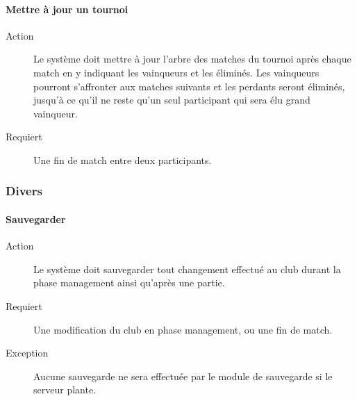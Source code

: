 \documentclass[a4paper]{article}
\begin{document}
\paragraph{Mettre à jour un tournoi}
\begin{description}
\item[Action] Le système doit mettre à jour l'arbre des matches du tournoi après chaque match en y indiquant les vainqueurs et les éliminés. Les vainqueurs pourront s'affronter aux matches suivants et les perdants seront éliminés, jusqu'à ce qu'il ne reste qu'un seul participant qui sera élu grand vainqueur.
\item[Requiert] Une fin de match entre deux participants.
\end{description}

\subsubsection{Divers}
\paragraph{Sauvegarder}
\begin{description}
\item[Action] Le système doit sauvegarder tout changement effectué au \gls{club} durant la phase management ainsi qu'après une partie.
\item[Requiert] Une modification du \gls{club} en phase management, ou une fin de match.
\item[Exception] Aucune sauvegarde ne sera effectuée par le module de sauvegarde si le \gls{serveur} plante.
\end{description}
\end{document}
